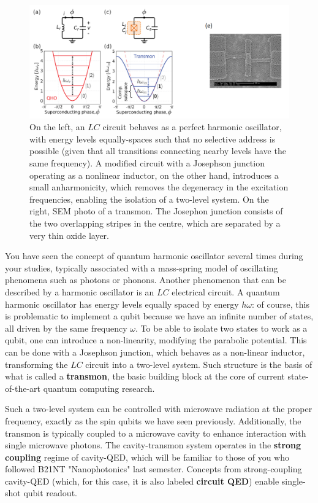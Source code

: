 \documentclass[a4paper,11pt]{article}
\begin{document}
\begin{figure}[h]
\centering
\includegraphics[width = 1\textwidth]{figures/transmon.png}
\caption{On the left, an $LC$ circuit behaves as a perfect harmonic oscillator, with energy levels equally-spaces such that no selective address is possible (given that all transitions connecting nearby levels have the same frequency). A modified circuit with a Josephson junction operating as a nonlinear inductor, on the other hand, introduces a small anharmonicity, which removes the degeneracy in the excitation frequencies, enabling the isolation of a two-level system. On the right, SEM photo of a transmon. The Josephon junction consists of the two overlapping stripes in the centre, which are separated by a very thin oxide layer. }
\label{fig:transmon}
\end{figure}

You have seen the concept of quantum harmonic oscillator several times during your studies, typically associated with a mass-spring model of oscillating phenomena such as photons or phonons. Another phenomenon that can be described by a harmonic oscillator is an $LC$ electrical circuit. A quantum harmonic oscillator has energy levels equally spaced by energy $h \omega$: of course, this is problematic to implement a qubit because we have an infinite number of states, all driven by the same frequency $\omega$.
\newline To be able to isolate two states to work as a qubit, one can introduce a non-linearity, modifying the parabolic potential. This can be done with a Josephson junction, which behaves as a non-linear inductor, transforming the $LC$ circuit into a two-level system. Such structure is the basis of what is called a {\bf transmon}, the basic building block at the core of current state-of-the-art quantum computing research.

Such a two-level system can be controlled with microwave radiation at the proper frequency, exactly as the spin qubits we have seen previously. Additionally, the transmon is typically coupled to a microwave cavity to enhance interaction with single microwave photons. The cavity-transmon system operates in the {\bf strong coupling} regime of cavity-QED, which will be familiar to those of you who followed B21NT "Nanophotonics" last semester. Concepts from strong-coupling cavity-QED (which, for this case, it is also labeled {\bf circuit QED}) enable single-shot qubit readout.
\end{document}
